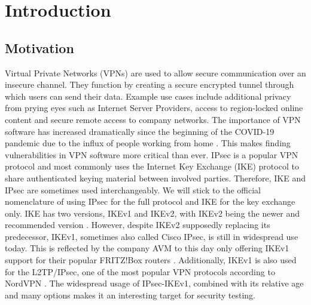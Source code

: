 %
%
% 
% 
% 

\chapter{Introduction}

\label{chap:Introduction}

\section{Motivation}
Virtual Private Networks (VPNs) are used to allow secure communication over an insecure channel. They function by creating a secure encrypted tunnel through which users can send their data. Example use cases include additional privacy from prying eyes such as Internet Server Providers, access to region-locked online content and secure remote access to company networks. The importance of VPN software has increased dramatically since the beginning of the COVID-19 pandemic due to the influx of people working from home \parencite{abhijith2020impact}. This makes finding vulnerabilities in VPN software more critical than ever. %
IPsec is a popular VPN protocol and most commonly uses the Internet Key Exchange (IKE) protocol to share authenticated keying material between involved parties. Therefore, IKE and IPsec are sometimes used interchangeably. We will stick to the official nomenclature of using IPsec for the full protocol and IKE for the key exchange only. IKE has two versions, IKEv1 and IKEv2, with IKEv2 being the newer and recommended version \parencite{nist791491}. However, despite IKEv2 supposedly replacing its predecessor, IKEv1, sometimes also called Cisco IPsec, is still in widespread use today. This is reflected by the company AVM to this day only offering IKEv1 support for their popular FRITZ!Box routers \parencite{avm2022}. Additionally, IKEv1 is also used for the L2TP/IPsec, one of the most popular VPN protocols according to NordVPN \parencite{nordvpn2021}. The widespread usage of IPsec-IKEv1, combined with its relative age and many options makes it an interesting target for security testing.


